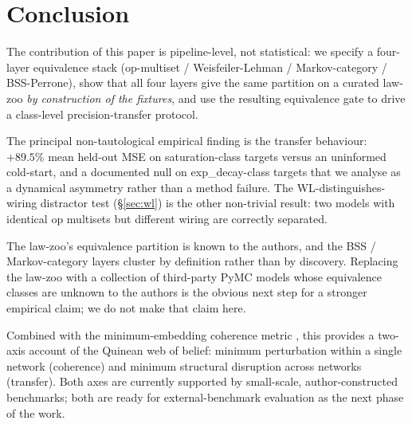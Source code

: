 \documentclass{article}
\begin{document}
\section{Conclusion}
\label{sec:conclusion}

The contribution of this paper is pipeline-level, not statistical:
we specify a four-layer equivalence stack
(op-multiset / Weisfeiler-Lehman / Markov-category /
BSS-Perrone), show that all four layers give the same partition on
a curated law-zoo \emph{by construction of the fixtures}, and use
the resulting equivalence gate to drive a class-level
precision-transfer protocol.

The principal non-tautological empirical finding is the transfer
behaviour: $+89.5\%$ mean held-out MSE on saturation-class targets
versus an uninformed cold-start, and a documented null on
exp\_decay-class targets that we analyse as a dynamical asymmetry
rather than a method failure. The WL-distinguishes-wiring distractor
test (\S\ref{sec:wl}) is the other non-trivial result: two models
with identical op multisets but different wiring are correctly
separated.

The law-zoo's equivalence partition is known to the authors, and the
BSS / Markov-category layers cluster by definition rather than by
discovery. Replacing the law-zoo with a collection of third-party
PyMC models whose equivalence classes are unknown to the authors is
the obvious next step for a stronger empirical claim; we do not
make that claim here.

Combined with the minimum-embedding coherence metric
\citep{Anonymous2026MEISPaper2}, this provides a two-axis
account of the Quinean web of belief: minimum perturbation within a
single network (coherence) and minimum structural disruption across
networks (transfer). Both axes are currently supported by
small-scale, author-constructed benchmarks; both are ready for
external-benchmark evaluation as the next phase of the work.



\end{document}
